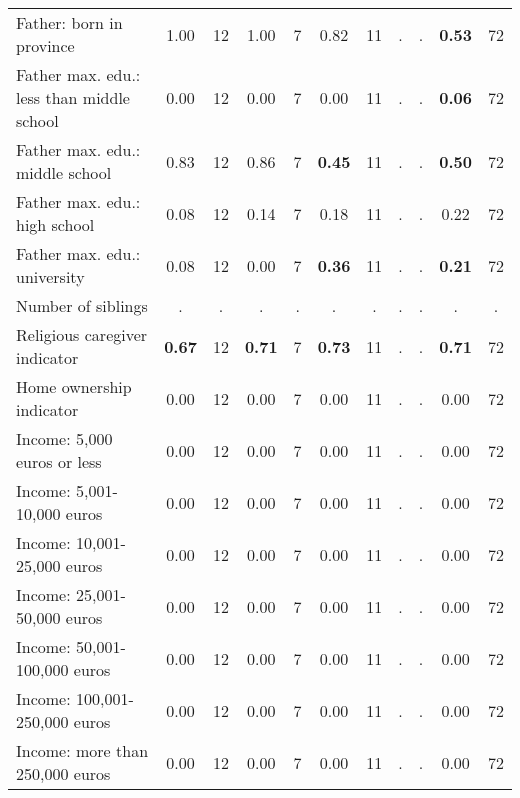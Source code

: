 \begin{tabular}{l c c c c c c c c c c}
Father: born in province &      1.00 &        12 &      1.00 &         7 &      0.82 &        11 &         . & . & \textbf{     0.53} &        72 \\
Father max. edu.: less than middle school &      0.00 &        12 &      0.00 &         7 &      0.00 &        11 &         . & . & \textbf{     0.06} &        72 \\
Father max. edu.: middle school &      0.83 &        12 &      0.86 &         7 & \textbf{     0.45} &        11 &         . & . & \textbf{     0.50} &        72 \\
Father max. edu.: high school &      0.08 &        12 &      0.14 &         7 &      0.18 &        11 &         . & . &      0.22 &        72 \\
Father max. edu.: university &      0.08 &        12 &      0.00 &         7 & \textbf{     0.36} &        11 &         . & . & \textbf{     0.21} &        72 \\
Number of siblings &         . & . &         . & . &         . & . &         . & . &         . & . \\
Religious caregiver indicator & \textbf{     0.67} &        12 & \textbf{     0.71} &         7 & \textbf{     0.73} &        11 &         . & . & \textbf{     0.71} &        72 \\
Home ownership indicator &      0.00 &        12 &      0.00 &         7 &      0.00 &        11 &         . & . &      0.00 &        72 \\
Income: 5,000 euros or less &      0.00 &        12 &      0.00 &         7 &      0.00 &        11 &         . & . &      0.00 &        72 \\
Income: 5,001-10,000 euros &      0.00 &        12 &      0.00 &         7 &      0.00 &        11 &         . & . &      0.00 &        72 \\
Income: 10,001-25,000 euros &      0.00 &        12 &      0.00 &         7 &      0.00 &        11 &         . & . &      0.00 &        72 \\
Income: 25,001-50,000 euros &      0.00 &        12 &      0.00 &         7 &      0.00 &        11 &         . & . &      0.00 &        72 \\
Income: 50,001-100,000 euros &      0.00 &        12 &      0.00 &         7 &      0.00 &        11 &         . & . &      0.00 &        72 \\
Income: 100,001-250,000 euros &      0.00 &        12 &      0.00 &         7 &      0.00 &        11 &         . & . &      0.00 &        72 \\
Income: more than 250,000 euros &      0.00 &        12 &      0.00 &         7 &      0.00 &        11 &         . & . &      0.00 &        72 \\
\bottomrule
\end{tabular}
